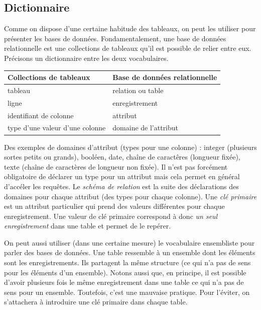 \subsection{Dictionnaire}
Comme on dispose d'une certaine habitude des tableaux, on peut les utiliser pour présenter les bases de données. Fondamentalement, une base de données relationnelle est une collections de tableaux qu'il est possible de relier entre eux. Précisons un dictionnaire entre les deux vocabulaires. 
\begin{center}
\begin{tabular}{l|l}
Collections de tableaux & Base de données relationnelle \\ \hline
 tableau & relation ou table \\
 ligne & enregistrement \\
 identifiant de colonne & attribut \\
 type d'une valeur d'une colonne & domaine de l'attribut
\end{tabular}
\end{center}
Des exemples de domaines d'attribut (types pour une colonne) : integer (plusieurs sortes petits ou grands), booléen, date, chaîne de caractêres (longueur fixée), texte (chaîne de caractères de longueur non fixée).
Il n'est pas forcément obligatoire de déclarer un type pour un attribut mais cela permet en général d'accéler les requêtes.\newline
{} Le \emph{schéma de relation} est la suite des déclarations des domaines pour chaque attribut (des types pour chaque colonne).\newline
{}Une \emph{clé primaire} est un attribut particulier qui prend des valeurs différentes pour chaque enregistrement. Une valeur de clé primaire correspond à donc \emph{un seul enregistrement} dans une table et permet de le repérer.

On peut aussi utiliser (dans une certaine mesure) le vocabulaire ensembliste pour parler des bases de données. Une table ressemble à un ensemble dont les éléments sont les enregistrements. Ils partagent la même structure (ce qui n'a pas de sens pour les éléments d'un ensemble). Notons aussi que, en principe, il est possible d'avoir plusieurs fois le même enregistrement dans une table ce qui n'a pas de sens pour un ensemble. Toutefois, c'est une mauvaise pratique. Pour l'éviter, on s'attachera à introduire une clé primaire dans chaque table.

